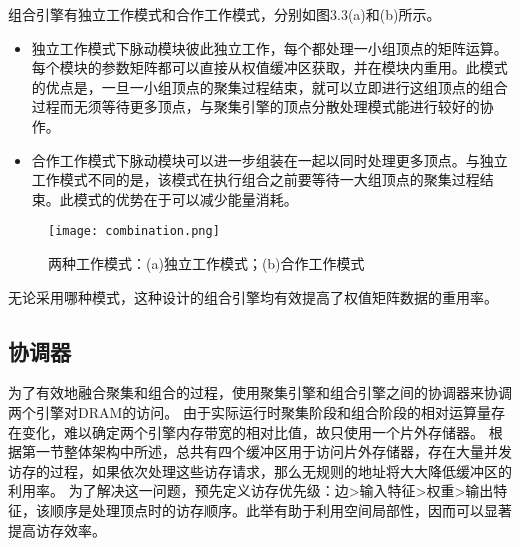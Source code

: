 组合引擎有独立工作模式和合作工作模式，分别如图3.3(a)和(b)所示。
\begin{itemize}
    \item 独立工作模式下脉动模块彼此独立工作，每个都处理一小组顶点的矩阵运算。每个模块的参数矩阵都可以直接从权值缓冲区获取，并在模块内重用。此模式的优点是，一旦一小组顶点的聚集过程结束，就可以立即进行这组顶点的组合过程而无须等待更多顶点，与聚集引擎的顶点分散处理模式能进行较好的协作。
    \item 合作工作模式下脉动模块可以进一步组装在一起以同时处理更多顶点。与独立工作模式不同的是，该模式在执行组合之前要等待一大组顶点的聚集过程结束。此模式的优势在于可以减少能量消耗。
\end{itemize}

\begin{figure}[htb]
    \centering
    \texttt{[image: combination.png]}
    \caption{两种工作模式：(a)独立工作模式；(b)合作工作模式}
\end{figure}

无论采用哪种模式，这种设计的组合引擎均有效提高了权值矩阵数据的重用率。

\subsection{协调器}
为了有效地融合聚集和组合的过程，使用聚集引擎和组合引擎之间的协调器来协调两个引擎对DRAM的访问。
由于实际运行时聚集阶段和组合阶段的相对运算量存在变化，难以确定两个引擎内存带宽的相对比值，故只使用一个片外存储器。
根据第一节整体架构中所述，总共有四个缓冲区用于访问片外存储器，存在大量并发访存的过程，如果依次处理这些访存请求，那么无规则的地址将大大降低缓冲区的利用率。
为了解决这一问题，预先定义访存优先级：边>输入特征>权重>输出特征，该顺序是处理顶点时的访存顺序。此举有助于利用空间局部性，因而可以显著提高访存效率。